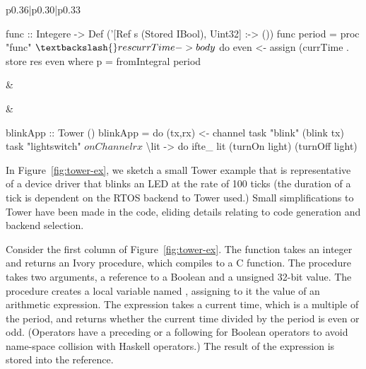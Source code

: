 \begin{figure*}[h!t]
  \begin{tabular}{p{}|p{}|p{}}
    \begin{smcode}
func :: Integere
     -> Def ('[Ref s (Stored IBool), Uint32]
             :-> ())
func period = proc "func" $ \textbackslash{}res currTime ->
  body $ do
    even <- assign (currTime .%
    store res even
    where
    p = fromIntegral period
    \end{smcode} &
     &
    \begin{smcode}
blinkApp :: Tower ()
blinkApp = do
  (tx,rx) <- channel
  task "blink" (blink tx)
  task "lightswitch" $
    onChannel rx $
      \textbackslash{}lit -> do
        ifte_ lit (turnOn light)
                  (turnOff light)
    \end{smcode}
  \end{tabular}
  \caption{Ivory (Column 1), Task (Col. 2), and Tower (Col. 3)}
  \label{fig:tower-ex}
\end{figure*}

In Figure~\ref{fig:tower-ex}, we sketch a small Tower example that is
representative of a device driver that blinks an LED at the rate of 100 ticks
(the duration of a tick is dependent on the RTOS backend to Tower used.)  Small
simplifications to Tower have been made in the code, eliding details relating to
code generation and backend selection.

Consider the first column of Figure~\ref{fig:tower-ex}.  The function takes an
integer and returns an Ivory procedure, which compiles to a C function.  The
procedure takes two arguments, a reference to a Boolean and a unsigned 32-bit
value.  The procedure creates a local variable named ,
assigning to it the value of an arithmetic expression.  The expression
takes a current time, which is a multiple of the period, and returns whether the
current time divided by the period is even or odd.  (Operators have a preceding
 or a following  for Boolean operators to avoid name-space collision
with Haskell operators.)  The result of the expression is stored into the
 reference.

